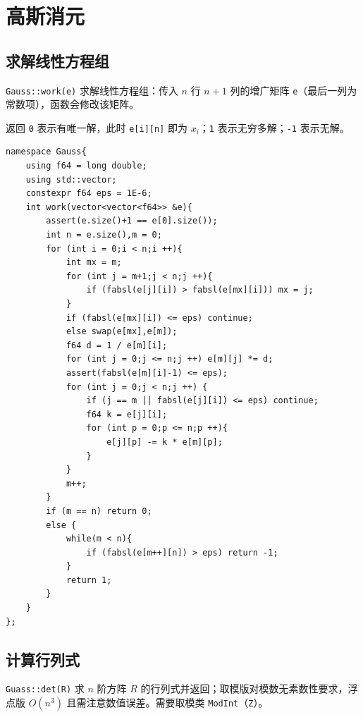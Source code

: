 \section{高斯消元}

\subsection{求解线性方程组}

\texttt{Gauss::work(e)} 求解线性方程组：传入 $n$ 行 $n+1$ 列的增广矩阵 \texttt{e}（最后一列为常数项），函数会修改该矩阵。

返回 \texttt{0} 表示有唯一解，此时 \texttt{e[i][n]} 即为 $x_i$；\texttt{1} 表示无穷多解；\texttt{-1} 表示无解。

\begin{lstlisting}
namespace Gauss{
    using f64 = long double;
    using std::vector;
    constexpr f64 eps = 1E-6;
    int work(vector<vector<f64>> &e){
        assert(e.size()+1 == e[0].size());
        int n = e.size(),m = 0;
        for (int i = 0;i < n;i ++){
            int mx = m;
            for (int j = m+1;j < n;j ++){
                if (fabsl(e[j][i]) > fabsl(e[mx][i])) mx = j;
            }
            if (fabsl(e[mx][i]) <= eps) continue;
            else swap(e[mx],e[m]);
            f64 d = 1 / e[m][i];
            for (int j = 0;j <= n;j ++) e[m][j] *= d;
            assert(fabsl(e[m][i]-1) <= eps);
            for (int j = 0;j < n;j ++) {
                if (j == m || fabsl(e[j][i]) <= eps) continue;
                f64 k = e[j][i];
                for (int p = 0;p <= n;p ++){
                    e[j][p] -= k * e[m][p];
                }
            }
            m++;
        }
        if (m == n) return 0;
        else {
            while(m < n){
                if (fabsl(e[m++][n]) > eps) return -1;
            }
            return 1;
        }
    }
};
\end{lstlisting}

\subsection{计算行列式}

\texttt{Guass::det(R)} 求 $n$ 阶方阵 $R$ 的行列式并返回；取模版对模数无素数性要求，浮点版 $O(n^3)$ 且需注意数值误差。需要取模类 \texttt{ModInt}（\texttt{Z}）。

